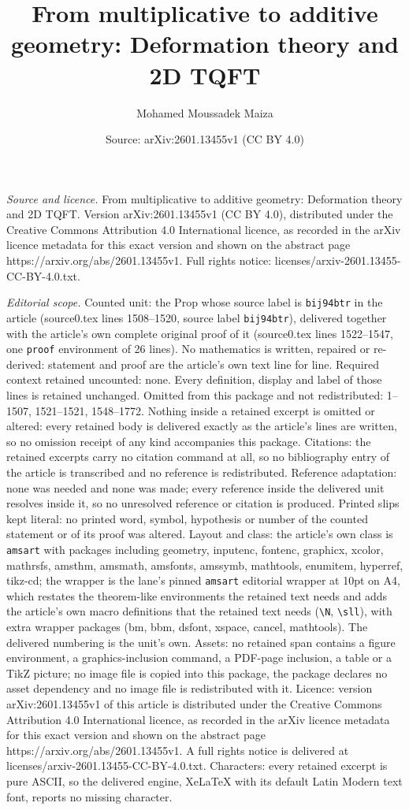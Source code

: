 \documentclass[10pt,a4paper]{amsart}
\title[From multiplicative to additive geometry: Deformation theory]{From multiplicative to additive geometry: Deformation theory and 2D TQFT}
\author{Mohamed Moussadek Maiza}
\date{Source: arXiv:2601.13455v1 (CC BY 4.0)}
\begin{document}
\maketitle

\noindent\emph{Source and licence.} From multiplicative to additive geometry: Deformation theory and 2D TQFT. Version arXiv:2601.13455v1 (CC BY 4.0), distributed under the Creative Commons Attribution 4.0 International licence, as recorded in the arXiv licence metadata for this exact version and shown on the abstract page https://arxiv.org/abs/2601.13455v1. Full rights notice: licenses/arxiv-2601.13455-CC-BY-4.0.txt.\par\smallskip

\noindent\textit{Editorial scope.} Counted unit: the Prop whose source label is \texttt{bij94btr} in the article (source0.tex lines 1508--1520, source label \texttt{bij94btr}), delivered together with the article's own complete original proof of it (source0.tex lines 1522--1547, one \texttt{proof} environment of 26 lines). No mathematics is written, repaired or re-derived: statement and proof are the article's own text line for line. Required context retained uncounted: none. Every definition, display and label of those lines is retained unchanged. Omitted from this package and not redistributed: 1--1507, 1521--1521, 1548--1772. Nothing inside a retained excerpt is omitted or altered: every retained body is delivered exactly as the article's lines are written, so no omission receipt of any kind accompanies this package. Citations: the retained excerpts carry no citation command at all, so no bibliography entry of the article is transcribed and no reference is redistributed. Reference adaptation: none was needed and none was made; every reference inside the delivered unit resolves inside it, so no unresolved reference or citation is produced. Printed slips kept literal: no printed word, symbol, hypothesis or number of the counted statement or of its proof was altered. Layout and class: the article's own class is \texttt{amsart} with packages including geometry, inputenc, fontenc, graphicx, xcolor, mathrsfs, amsthm, amsmath, amsfonts, amssymb, mathtools, enumitem, hyperref, tikz-cd; the wrapper is the lane's pinned \texttt{amsart} editorial wrapper at 10pt on A4, which restates the theorem-like environments the retained text needs and adds the article's own macro definitions that the retained text needs (\texttt{\textbackslash N}, \texttt{\textbackslash sll}), with extra wrapper packages (bm, bbm, dsfont, xspace, cancel, mathtools). The delivered numbering is the unit's own. Assets: no retained span contains a figure environment, a graphics-inclusion command, a PDF-page inclusion, a table or a TikZ picture; no image file is copied into this package, the package declares no asset dependency and no image file is redistributed with it. Licence: version arXiv:2601.13455v1 of this article is distributed under the Creative Commons Attribution 4.0 International licence, as recorded in the arXiv licence metadata for this exact version and shown on the abstract page https://arxiv.org/abs/2601.13455v1. A full rights notice is delivered at licenses/arxiv-2601.13455-CC-BY-4.0.txt. Characters: every retained excerpt is pure ASCII, so the delivered engine, XeLaTeX with its default Latin Modern text font, reports no missing character.
\end{document}
